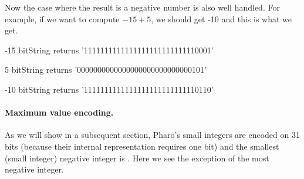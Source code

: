 \documentclass[a4paper,10pt,twoside]{book}
\begin{document}
%	
% 
%   
%    
%	
%	


Now the case where the result is a negative number is also well handled. For example, if we want to compute $-15 + 5$, we should get -10 and this is what we get.

\begin{code}{}
-15 bitString 
	returns '1111111111111111111111111110001'

5 bitString 
	returns '0000000000000000000000000000101'
	
-10 bitString 
	returns '1111111111111111111111111110110'
\end{code}


\paragraph{Maximum value encoding.}		
As we will show in a subsequent section, Pharo's small integers are encoded on 31 bits (because their internal representation requires one bit) and the smallest (small integer) negative integer is . Here we see the exception of the most negative integer.
\end{document}
